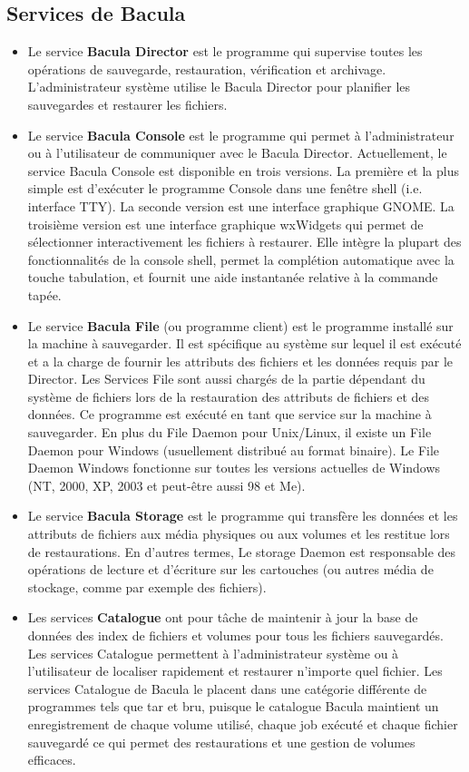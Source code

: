\documentclass[a4paper,11pt]{report}
\begin{document}
\subsection{Services de Bacula}
\begin{itemize}
  \item Le service \textbf{Bacula Director} est le programme qui supervise toutes les opérations de sauvegarde, restauration, vérification et archivage. L'administrateur système utilise le Bacula Director pour planifier les sauvegardes et restaurer les fichiers.
  \item Le service \textbf{Bacula Console} est le programme qui permet à l'administrateur ou à l'utilisateur de communiquer avec le Bacula Director. Actuellement, le service Bacula Console est disponible en trois versions. La première et la plus simple est d'exécuter le programme Console dans une fenêtre shell (i.e. interface TTY). La seconde version est une interface graphique GNOME. La troisième version est une interface graphique wxWidgets qui permet de sélectionner interactivement les fichiers à restaurer. Elle intègre la plupart des fonctionnalités de la console shell, permet la complétion automatique avec la touche tabulation, et fournit une aide instantanée relative à la commande tapée.
  \item Le service \textbf{Bacula File} (ou programme client) est le programme installé sur la machine à sauvegarder. Il est spécifique au système sur lequel il est exécuté et a la charge de fournir les attributs des fichiers et les données requis par le Director. Les Services File sont aussi chargés de la partie dépendant du système de fichiers lors de la restauration des attributs de fichiers et des données. Ce programme est exécuté en tant que service sur la machine à sauvegarder. En plus du File Daemon pour Unix/Linux, il existe un File Daemon pour Windows (usuellement distribué au format binaire). Le File Daemon Windows fonctionne sur toutes les versions actuelles de Windows (NT, 2000, XP, 2003 et peut-être aussi 98 et Me).
  \item Le service \textbf{Bacula Storage} est le programme qui transfère les données et les attributs de fichiers aux média physiques ou aux volumes et les restitue lors de restaurations. En d'autres termes, Le storage Daemon est responsable des opérations de lecture et d'écriture sur les cartouches (ou autres média de stockage, comme par exemple des fichiers).
  \item Les services \textbf{Catalogue} ont pour tâche de maintenir à jour la base de données des index de fichiers et volumes pour tous les fichiers sauvegardés. Les services Catalogue permettent à l'administrateur système ou à l'utilisateur de localiser rapidement et restaurer n'importe quel fichier. Les services Catalogue de Bacula le placent dans une catégorie différente de programmes tels que tar et bru, puisque le catalogue Bacula maintient un enregistrement de chaque volume utilisé, chaque job exécuté et chaque fichier sauvegardé ce qui permet des restaurations et une gestion de volumes efficaces.
\end{itemize}
\end{document}
